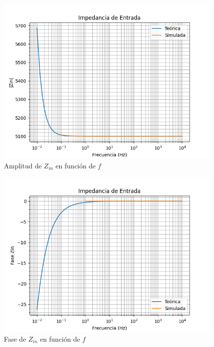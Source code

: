 \begin{figure}[H]
    \centering 
    \includegraphics [scale=0.6] {../Ejercicio3-CircuitoIntegradoresyDerivadores/Imagenes/comparativo-integrador-zin-amplitud.png} 
    \caption{Amplitud de $Z_{in}$ en función de $f$}
    \label{fig:emptyPlotTool}
\end{figure}

\begin{figure}[H]
    \centering 
    \includegraphics [scale=0.6] {../Ejercicio3-CircuitoIntegradoresyDerivadores/Imagenes/comparativo-integrador-zin-fase.png} 
    \caption{Fase de $Z_{in}$ en función de $f$ }
    \label{fig:emptyPlotTool}
\end{figure}


